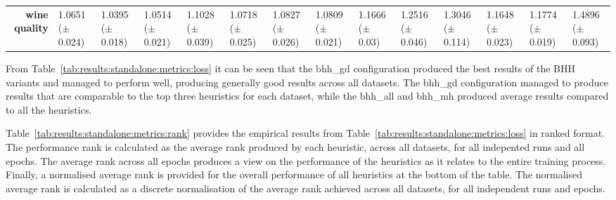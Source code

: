 \begin{sidewaystable}[htbp]
{\begin{tabular}{r|lll|l|l|l|l|l|lllll}
			\textbf{wine quality}               & \cellcolor[rgb]{ .631,  .816,  .494}1.0651 ($\pm$0.024)                        & \cellcolor[rgb]{ .388,  .745,  .482}1.0395 ($\pm$0.018) & \cellcolor[rgb]{ .502,  .776,  .486}1.0514 ($\pm$0.021) & \cellcolor[rgb]{ 1,  .922,  .518}1.1028 ($\pm$0.039)    & \cellcolor[rgb]{ .698,  .831,  .498}1.0718 ($\pm$0.025) & \cellcolor[rgb]{ .804,  .863,  .506}1.0827 ($\pm$0.026) & \cellcolor[rgb]{ .788,  .859,  .502}1.0809 ($\pm$0.021) & \cellcolor[rgb]{ .996,  .839,  .502}1.1666 ($\pm$0.03)  & \cellcolor[rgb]{ .992,  .725,  .482}1.2516 ($\pm$0.046) & \cellcolor[rgb]{ .988,  .659,  .467}1.3046 ($\pm$0.114) & \cellcolor[rgb]{ .996,  .843,  .502}1.1648 ($\pm$0.023) & \cellcolor[rgb]{ .996,  .824,  .502}1.1774 ($\pm$0.019) & \cellcolor[rgb]{ .973,  .412,  .42}1.4896 ($\pm$0.093)  \\
			\cmidrule{5-5}\cmidrule{7-7}\cmidrule{9-9}\end{tabular}%
	}
\end{sidewaystable}%

From Table~\ref{tab:results:standalone:metrics:loss} it can be seen that the bhh\_gd configuration produced the best results of the \acs{BHH} variants and managed to perform well, producing generally good results across all datasets. The bhh\_gd configuration managed to produce results that are comparable to the top three heuristics for each dataset, while the bhh\_all and bhh\_mh produced average results compared to all the heuristics.

Table~\ref{tab:results:standalone:metrics:rank} provides the empirical results from Table~\ref{tab:results:standalone:metrics:loss} in ranked format. The performance rank is calculated as the average rank produced by each heuristic, across all datasets, for all indepented runs and all epochs. The average rank across all epochs produces a view on the performance of the heuristics as it relates to the entire training process. Finally, a normalised average rank is provided for the overall performance of all heuristics at the bottom of the table. The normalised average rank is calculated as a discrete normalisation of the average rank achieved across all datasets, for all independent runs and epochs.

